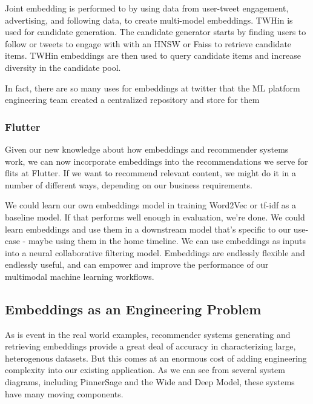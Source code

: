 \documentclass[11pt, table]{diazessay} %
\begin{document}
\begin{sloppypar}
Joint embedding is performed to by using data from user-tweet engagement, advertising, and following data, to create multi-model embeddings. TWHin is used for candidate generation. The candidate generator starts by finding users to follow or tweets to engage with with an HNSW or Faiss to retrieve candidate items. TWHin embeddings are then used to query candidate items and increase diversity in the candidate pool. 

In fact, there are so many uses for embeddings at twitter that the ML platform engineering team created a centralized repository and store for them


\subsubsection{Flutter}

Given our new knowledge about how embeddings and recommender systems work, we can now incorporate embeddings into the recommendations we serve for flits at Flutter.  If we want to recommend relevant content, we might do it in a number of different ways, depending on our business requirements. 

We could learn our own embeddings model in training Word2Vec or tf-idf as a baseline model. If that performs well enough in evaluation, we're done. We could learn embeddings and use them in a downstream model that's specific to our use-case - maybe using them in the home timeline.  We can use embeddings as inputs into a neural collaborative filtering model\citep{he2017neural}.
Embeddings are endlessly flexible and endlessly useful, and can empower and improve the performance of our multimodal machine learning workflows. 

\subsection{Embeddings as an Engineering Problem}

As is event in the real world examples, recommender systems generating and retrieving embeddings provide a great deal of accuracy in characterizing large, heterogenous datasets. But this comes at an enormous cost of adding engineering complexity into our existing application.  As we can see from several system diagrams, including PinnerSage and the Wide and Deep Model, these systems have many moving components. 


\end{sloppypar}
\end{document}
